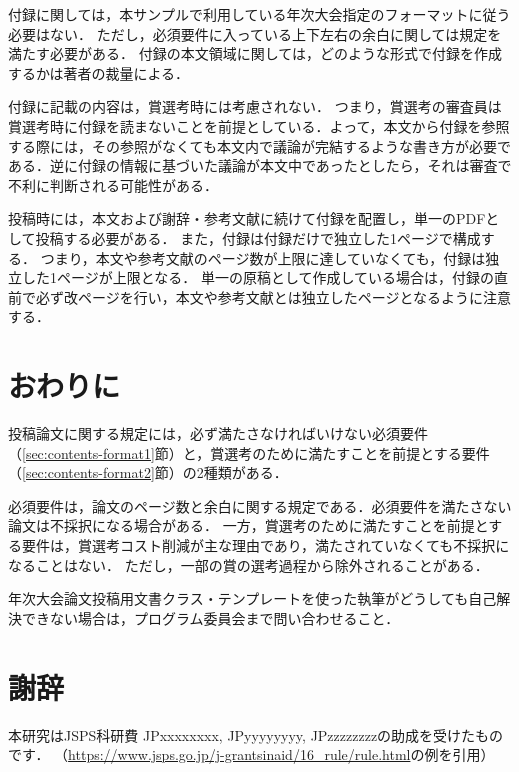 \documentclass[
  platex, dvipdfmx,  %
]{nlp2024}
\begin{document}
付録に関しては，本サンプルで利用している年次大会指定のフォーマットに従う必要はない．
ただし，必須要件に入っている上下左右の余白に関しては規定を満たす必要がある．
付録の本文領域に関しては，どのような形式で付録を作成するかは著者の裁量による．

付録に記載の内容は，賞選考時には考慮されない．
つまり，賞選考の審査員は賞選考時に付録を読まないことを前提としている．よって，本文から付録を参照する際には，その参照がなくても本文内で議論が完結するような書き方が必要である．逆に付録の情報に基づいた議論が本文中であったとしたら，それは審査で不利に判断される可能性がある．



投稿時には，本文および謝辞・参考文献に続けて付録を配置し，単一のPDFとして投稿する必要がある．
また，付録は付録だけで独立した1ページで構成する．
つまり，本文や参考文献のページ数が上限に達していなくても，付録は独立した1ページが上限となる．
単一の原稿として作成している場合は，付録の直前で必ず改ページを行い，本文や参考文献とは独立したページとなるように注意する．


\section{おわりに}
投稿論文に関する規定には，必ず満たさなければいけない必須要件（\ref{sec:contents-format1}節）と，賞選考のために満たすことを前提とする要件（\ref{sec:contents-format2}節）の2種類がある．

必須要件は，論文のページ数と余白に関する規定である．必須要件を満たさない論文は不採択になる場合がある．
一方，賞選考のために満たすことを前提とする要件は，賞選考コスト削減が主な理由であり，満たされていなくても不採択になることはない．
ただし，一部の賞の選考過程から除外されることがある．

年次大会論文投稿用文書クラス・テンプレートを使った執筆がどうしても自己解決できない場合は，プログラム委員会まで問い合わせること．





\newpage
\section*{謝辞}

本研究はJSPS科研費 JPxxxxxxxx, JPyyyyyyyy, JPzzzzzzzzの助成を受けたものです．
（\url{https://www.jsps.go.jp/j-grantsinaid/16_rule/rule.html}の例を引用）


\end{document}
